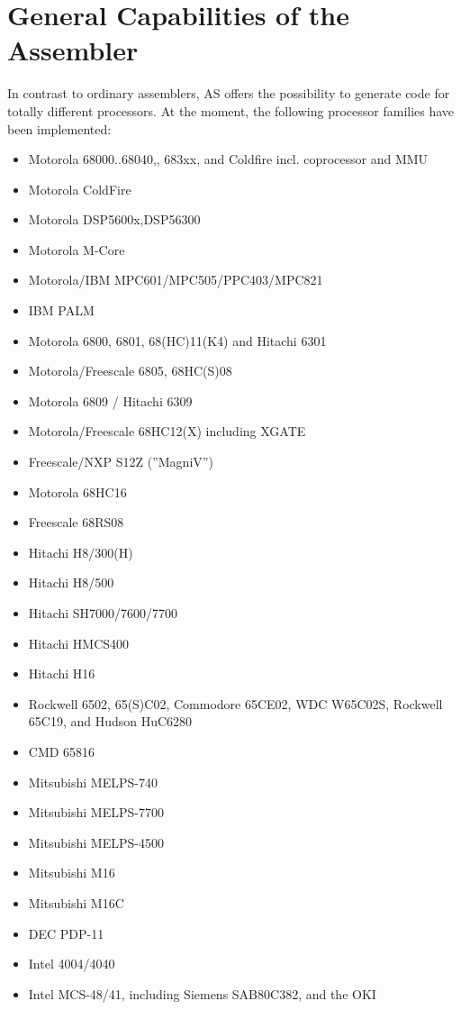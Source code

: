 \documentclass[12pt,twoside]{report}
\begin{document}

\section{General Capabilities of the Assembler}

In contrast to ordinary assemblers, AS offers the possibility to
generate code for totally different processors.  At the moment, the
following processor families have been implemented:
\begin{itemize}
\item{Motorola 68000..68040,, 683xx, and Coldfire incl. coprocessor and MMU}
\item{Motorola ColdFire}
\item{Motorola DSP5600x,DSP56300}\item{Motorola M-Core}
\item{Motorola/IBM MPC601/MPC505/PPC403/MPC821}
\item{IBM PALM}
\item{Motorola 6800, 6801, 68(HC)11(K4) and Hitachi 6301}
\item{Motorola/Freescale 6805, 68HC(S)08}
\item{Motorola 6809 / Hitachi 6309}
\item{Motorola/Freescale 68HC12(X) including XGATE}
\item{Freescale/NXP S12Z (''MagniV'')}
\item{Motorola 68HC16}
\item{Freescale 68RS08}
\item{Hitachi H8/300(H)}
\item{Hitachi H8/500}
\item{Hitachi SH7000/7600/7700}
\item{Hitachi HMCS400}
\item{Hitachi H16}
\item{Rockwell 6502, 65(S)C02, Commodore 65CE02, WDC W65C02S, Rockwell 65C19, and
      Hudson HuC6280}
\item{CMD 65816}
\item{Mitsubishi MELPS-740}
\item{Mitsubishi MELPS-7700}
\item{Mitsubishi MELPS-4500}
\item{Mitsubishi M16}
\item{Mitsubishi M16C}
\item{DEC PDP-11}
\item{Intel 4004/4040}
\item{Intel MCS-48/41, including Siemens SAB80C382, and the OKI
}
\end{itemize}
\end{document}
